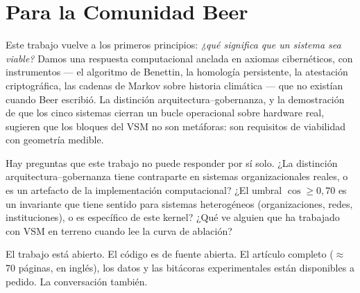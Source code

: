 \documentclass[11pt, a4paper]{article}
\begin{document}
\section*{Para la Comunidad Beer}

Este trabajo vuelve a los primeros principios: \emph{¿qué significa que un sistema sea
viable?} Damos una respuesta computacional anclada en axiomas cibernéticos, con
instrumentos --- el algoritmo de Benettin, la homología persistente, la atestación
criptográfica, las cadenas de Markov sobre historia climática --- que no existían cuando
Beer escribió. La distinción arquitectura--gobernanza, y la demostración de que los
cinco sistemas cierran un bucle operacional sobre hardware real, sugieren que los
bloques del VSM no son metáforas: son requisitos de viabilidad con geometría medible.

Hay preguntas que este trabajo no puede responder por sí solo. ¿La distinción
arquitectura--gobernanza tiene contraparte en sistemas organizacionales reales, o es un
artefacto de la implementación computacional? ¿El umbral $\cos \geq 0{,}70$ es un
invariante que tiene sentido para sistemas heterogéneos (organizaciones, redes,
instituciones), o es específico de este kernel? ¿Qué ve alguien que ha trabajado con
VSM en terreno cuando lee la curva de ablación?

El trabajo está abierto. El código es de fuente abierta. El artículo completo
($\approx$70 páginas, en inglés), los datos y las bitácoras experimentales están
disponibles a pedido. La conversación también.
\end{document}
